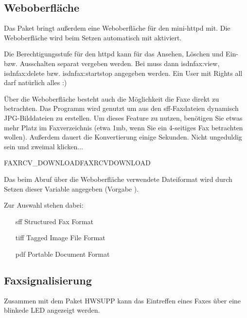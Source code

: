 \subsection {Weboberfläche}

    Das Paket bringt außerdem eine Weboberfläche für den mini-httpd mit.
    Die Weboberfläche wird beim Setzen  
    automatisch mit aktiviert.

    Die Berechtigungsstufe für den httpd kann für das Ansehen, Löschen und Ein-
    bzw. Ausschalten separat vergeben werden. Bei  muss
    dann \dq{}isdnfax:view\dq{}, \dq{}isdnfax:delete\dq{} bzw. \dq{}isdnfax:startstop\dq{}
    angegeben werden. Ein User mit Rights \dq{}all\dq{} darf natürlich alles :)
    
    Über die Weboberfläche besteht auch die Möglichkeit die Faxe direkt
    zu betrachten. Das Programm  wird genutzt um aus den sff-Faxdateien
    dynamisch JPG-Bilddateien zu erstellen.
    Um dieses Feature zu nutzen, benötigen Sie etwas mehr Platz im Faxverzeichnis
    (etwa 1mb, wenn Sie ein 4-seitiges Fax betrachten wollen). Außerdem dauert
    die Konvertierung einige Sekunden. Nicht ungeduldig sein und zweimal klicken...

\begin{description}

 {FAXRCV\_DOWNLOAD}{FAXRCVDOWNLOAD}

    Das beim Abruf über die Weboberfläche verwendete Dateiformat 
    wird durch Setzen dieser Variable angegeben (Vorgabe ). 
   
    Zur Auswahl stehen dabei:
    \begin{itemize}
        \item[sff] Structured Fax Format
        \item[tiff] Tagged Image File Format
        \item[pdf] Portable Document Format
    \end{itemize}

\end {description}

\subsection {Faxsignalisierung}

    Zusammen mit dem Paket HWSUPP kann das Eintreffen eines Faxes über eine 
    blinkede LED angezeigt werden.
    
